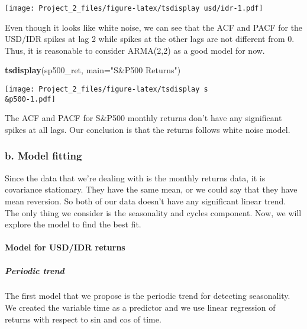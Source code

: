 \documentclass[]{article}
\newenvironment{Shaded}{\begin{snugshade}}{\end{snugshade}}
\newcommand{\KeywordTok}[1]{\textcolor[rgb]{0.13,0.29,0.53}{\textbf{#1}}}
\newcommand{\DataTypeTok}[1]{\textcolor[rgb]{0.13,0.29,0.53}{#1}}
\newcommand{\StringTok}[1]{\textcolor[rgb]{0.31,0.60,0.02}{#1}}
\newcommand{\NormalTok}[1]{#1}
\let\oldparagraph\paragraph
\renewcommand{\paragraph}[1]{\oldparagraph{#1}\mbox{}}
\let\oldsubparagraph\subparagraph
\renewcommand{\subparagraph}[1]{\oldsubparagraph{#1}\mbox{}}
\begin{document}
\texttt{[image: Project\_2\_files/figure-latex/tsdisplay usd/idr-1.pdf]}

Even though it looks like white noise, we can see that the ACF and PACF
for the USD/IDR spikes at lag 2 while spikes at the other lags are not
different from 0. Thus, it is reasonable to consider ARMA(2,2) as a good
model for now.

\begin{Shaded}
\begin{Highlighting}[]
\KeywordTok{tsdisplay}\NormalTok{(sp500_ret, }\DataTypeTok{main=}\StringTok{"S&P500 Returns"}\NormalTok{)}
\end{Highlighting}
\end{Shaded}

\texttt{[image: Project\_2\_files/figure-latex/tsdisplay s\\\&p500-1.pdf]}

The ACF and PACF for S\&P500 monthly returns don't have any significant
spikes at all lags. Our conclusion is that the returns follows white
noise model.

\subsubsection{b. Model fitting}\label{b.-model-fitting}

Since the data that we're dealing with is the monthly returns data, it
is covariance stationary. They have the same mean, or we could say that
they have mean reversion. So both of our data doesn't have any
significant linear trend. The only thing we consider is the seasonality
and cycles component. Now, we will explore the model to find the best
fit.

\paragraph{Model for USD/IDR returns}\label{model-for-usdidr-returns}

\subparagraph{Periodic trend}\label{periodic-trend}

The first model that we propose is the periodic trend for detecting
seasonality. We created the variable time as a predictor and we use
linear regression of returns with respect to sin and cos of time.
\end{document}
